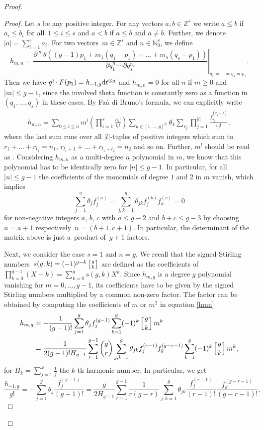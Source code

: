 \documentclass[pdftex]{sigma}
\numberwithin{equation}{section}
\newcommand\gf[2]{\genfrac{}{}{0pt}{}{#1}{#2}}
\begin{document}
\begin{proof}
\begin{proof}
		Let $s$ be any positive integer. For any vectors $a,b\in \mathbb{Z}^s$ we write $a\le b$ if $a_i\le b_i$ for all~${1\le i\le s}$ and $a<b$ if $a\le b$ and $a\neq b$. Further, we denote $|a|=\sum_{i=1}^sa_i$. For two vectors~${m\in \mathbb{Z}^s}$ and $n\in\mathbb{N}_0^s$, we define
		\[h_{m,n}=\left.\frac{\partial^{|n|}\theta((g-1)p_1+m_1(q_1-p_{1})+\dots+m_s(q_s-p_{1}))}{\partial q_1^{n_1}\cdots\partial q_s^{n_s}}\right|_{q_1=\dots=q_s=p_{1}}.\]
		Then we have $g!\cdot F(p_1)=h_{-1,g}{\rm d}t^{\otimes g}$ and $h_{m,n}=0$ for all $n$ if $m\ge 0$ and $|m|\le g-1$, since the involved theta function is constantly zero as a function in $(q_1,\dots,q_s)$ in these cases. By Fa\`a di Bruno's formula, we can explicitly write
		\begin{align}\label{hmn}
			h_{m,n}=\sum_{0\le l\le n} m^l\left(\prod_{i=1}^s\frac{n_i!}{l_i!}\right)\sum_{k\in [1,\dots,g]^{|l|}}\theta_k\sum_{r_j}\prod_{j=1}^{|l|}\frac{f_{k_j}^{(r_{j}-1)}}{r_{j}!},
		\end{align}
		where the last sum runs over all $|l|$-tuples of positive integers  which sum to $r_{1}+\dots+r_{l_1}=n_1$, $r_{l_1+1}+\dots+r_{l_1+l_2}=n_2$ and so on. Further, $m^l$ should be read as . Considering $h_{m,n}$ as a multi-degree $n$ polynomial in $m$, we know that this polynomial has to be identically zero for $|n|\le g-1$. In particular, for all $|n|\le g-1$ the coefficients of the monomials of degree $1$ and $2$ in $m$ vanish, which implies
		\[\sum_{j=1}^g\theta_jf_j^{(a)}=\sum_{j,k=1}^g\theta_{jk}f_j^{(b)}f_k^{(c)}=0\]
		for non-negative integers $a$, $b$, $c$ with $a\le g-2$ and $b+c\le g-3$ by choosing ${n=a+1}$ respectively~${n=(b+1,c+1)}$.
		In particular, the determinant of the matrix above is just a~product of~${g+1}$ factors.
		
		Next, we consider the case $s=1$ and $n=g$. We recall that the signed Stirling numbers~${s(g,k)=(-1)^{g-k}\left[\gf{g}{k}\right]}$ are defined as the coefficients of $\prod_{k=0}^{g-1}(X-k)=\sum_{k=0}^g s(g,k)X^k$. Since $h_{m,g}$ is a degree $g$ polynomial vanishing for $m=0,\dots,g-1$, its coefficients have to be given by the signed Stirling numbers multiplied by a common non-zero factor. The factor can be obtained by computing the coefficients of $m$ or $m^2$ in equation \eqref{hmn}
		\begin{align*}
			h_{m,g}&=-\frac{1}{(g-1)!}\sum_{j=1}^g\theta_jf_j^{(g-1)}\sum_{k=1}^g (-1)^{k} \left[\gf{g}{k}\right] m^k\\
			&=\frac{1}{2(g-1)!H_{g-1}}\sum_{r=1}^{g-1}\binom{g}{r}\sum_{j,k=1}^g\theta_{jk}f_j^{(r-1)}f_k^{(g-r-1)}\sum_{k=1}^g (-1)^{k} \left[\gf{g}{k}\right] m^k,
		\end{align*}
		for $H_{k}=\sum_{j=1}^{k}\frac{1}{j}$ the $k$-th harmonic number.
		In particular, we get \[\frac{h_{-1,g}}{g!}=-\sum_{j=1}^g\theta_j\frac{f_j^{(g-1)}}{(g-1)!}=\frac{g}{2H_{g-1}}\sum_{r=1}^{g-1}\frac{1}{r(g-r)}\sum_{j,k=1}^g\theta_{jk}\frac{f_j^{(r-1)}}{(r-1)!}\frac{f_k^{(g-r-1)}}{(g-r-1)!}.\]
		

\end{proof}
\end{proof}
\end{document}
